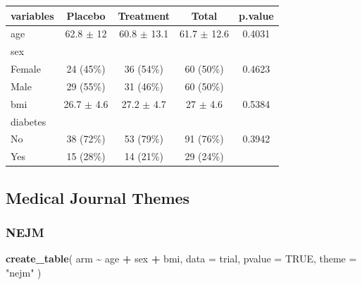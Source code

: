 \documentclass[
]{article}
\newenvironment{Shaded}{\begin{snugshade}}{\end{snugshade}}
\newcommand{\AttributeTok}[1]{\textcolor[rgb]{0.13,0.29,0.53}{#1}}
\newcommand{\ConstantTok}[1]{\textcolor[rgb]{0.56,0.35,0.01}{#1}}
\newcommand{\FunctionTok}[1]{\textcolor[rgb]{0.13,0.29,0.53}{\textbf{#1}}}
\newcommand{\NormalTok}[1]{#1}
\newcommand{\SpecialCharTok}[1]{\textcolor[rgb]{0.81,0.36,0.00}{\textbf{#1}}}
\newcommand{\StringTok}[1]{\textcolor[rgb]{0.31,0.60,0.02}{#1}}
\begin{document}
\begin{tabular}{lcccc}
\toprule
\definecolor{nejmstripe}{HTML}{fefcf0}
\definecolor{nejmtext}{HTML}{333333}
\definecolor{nejmstripe}{HTML}{fefcf0}
\definecolor{nejmtext}{HTML}{333333}

\textbf{variables} & \textbf{Placebo} & \textbf{Treatment} & \textbf{Total} & \textbf{p.value} \\
\midrule
age & 62.8 $\pm$ 12 & 60.8 $\pm$ 13.1 & 61.7 $\pm$ 12.6 & 0.4031 \\
\rowcolor{nejmstripe} sex &  &  &  &  \\
\hspace{1em}Female & 24 (45\%) & 36 (54\%) & 60 (50\%) & 0.4623 \\
\rowcolor{nejmstripe} \hspace{1em}Male & 29 (55\%) & 31 (46\%) & 60 (50\%) &  \\
bmi & 26.7 $\pm$ 4.6 & 27.2 $\pm$ 4.7 & 27 $\pm$ 4.6 & 0.5384 \\
\rowcolor{nejmstripe} diabetes &  &  &  &  \\
\hspace{1em}No & 38 (72\%) & 53 (79\%) & 91 (76\%) & 0.3942 \\
\rowcolor{nejmstripe} \hspace{1em}Yes & 15 (28\%) & 14 (21\%) & 29 (24\%) &  \\
\bottomrule
\end{tabular}

\subsection{Medical Journal Themes}\label{medical-journal-themes}

\subsubsection{NEJM}\label{nejm}

\begin{Shaded}
\begin{Highlighting}[]
\FunctionTok{create\_table}\NormalTok{(}
\NormalTok{  arm }\SpecialCharTok{\textasciitilde{}}\NormalTok{ age }\SpecialCharTok{+}\NormalTok{ sex }\SpecialCharTok{+}\NormalTok{ bmi,}
  \AttributeTok{data =}\NormalTok{ trial,}
  \AttributeTok{pvalue =} \ConstantTok{TRUE}\NormalTok{,}
  \AttributeTok{theme =} \StringTok{"nejm"}
\NormalTok{)}
\end{Highlighting}
\end{Shaded}
\end{document}
